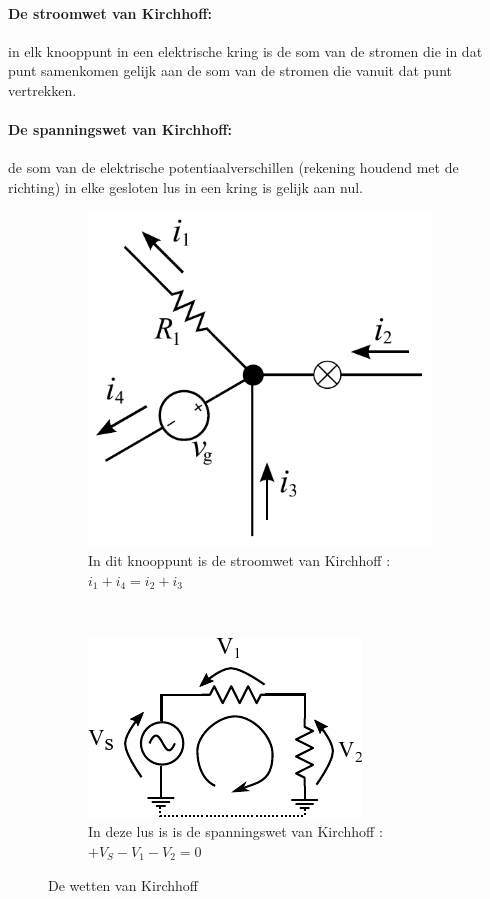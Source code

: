 \documentclass{article}
\begin{document}
			\paragraph*{De stroomwet van Kirchhoff:} in elk knooppunt in een elektrische kring is de som van de stromen die in dat punt samenkomen gelijk aan de som van de stromen die vanuit dat punt vertrekken. %
			\paragraph*{De spanningswet van Kirchhoff:} de som van de elektrische potentiaalverschillen (rekening houdend met de richting) in elke gesloten lus in een kring is gelijk aan nul. 

			\begin{figure}[htbp!]
				\centering
				\begin{subfigure}[b]{0.45\linewidth}
					\centering
					\includegraphics[scale=0.5]{kcl.pdf}
					\caption{In dit knooppunt is de stroomwet van Kirchhoff : $i_1 + i_4 = i_2+i_3$}
					\label{subfig:kcl}
				\end{subfigure}
				~
				\begin{subfigure}[b]{0.45\linewidth}
					\centering
					\includegraphics{kvl.pdf}
					\caption{In deze lus is is de spanningswet van Kirchhoff : $ + V_S - V_1 - V_2 = 0$}
					\label{subfig:kvl}
				\end{subfigure}
			\caption{De wetten van Kirchhoff}
			\label{fig:kirchoff}
			\end{figure}
\end{document}
